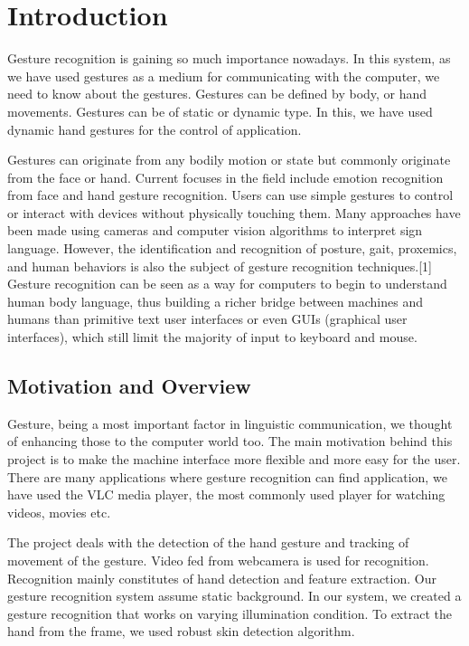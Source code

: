 \documentclass[a4paper,11pt]{article}
\begin{document}
	\newpage
	\tableofcontents
	\newpage
	\listoffigures
	\newpage
	\printacronyms[include-classes=abbrev,name=Abbreviations]
	\newpage

	\section{Introduction}
		
		Gesture recognition is gaining so much importance nowadays. In this system, as we have used gestures as a medium for communicating with the computer, we need to know about the gestures. Gestures can be defined by body, or hand movements. Gestures can be of static or dynamic type. In this, we have used dynamic hand gestures for the control of application.

		Gestures can originate from any bodily motion or state but commonly originate from the face or hand. Current focuses in the field include emotion recognition from face and hand gesture recognition. Users can use simple gestures to control or interact with devices without physically touching them. Many approaches have been made using cameras and computer vision algorithms to interpret sign language. However, the identification and recognition of posture, gait, proxemics, and human behaviors is also the subject of gesture recognition techniques.[1] Gesture recognition can be seen as a way for computers to begin to understand human body language, thus building a richer bridge between machines and humans than primitive text user interfaces or even GUIs (graphical user interfaces), which still limit the majority of input to keyboard and mouse.
		\subsection{Motivation and Overview}
		
			Gesture, being a most important factor in linguistic communication, we thought of enhancing those to the computer world too. The main motivation behind this project is to make the machine interface more flexible and more easy for the user. There are many applications where gesture recognition can find application, we have used the VLC media player, the most commonly used player for watching videos, movies etc.

			The project deals with the detection of the hand gesture and tracking of movement of the gesture. Video fed from webcamera is used for recognition. Recognition mainly constitutes of hand detection and feature extraction. Our gesture recognition system assume static background. In our system, we created a gesture recognition that works on varying illumination condition. To extract the hand from the frame, we used robust skin detection algorithm.
\end{document}
